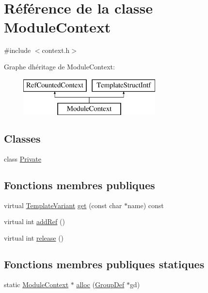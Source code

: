\hypertarget{class_module_context}{}\section{Référence de la classe Module\+Context}
\label{class_module_context}


{\ttfamily \#include $<$context.\+h$>$}

Graphe d\textquotesingle{}héritage de Module\+Context\+:\begin{figure}[H]
\begin{center}
\leavevmode
\includegraphics[height=2.000000cm]{class_module_context}
\end{center}
\end{figure}
\subsection*{Classes}
\begin{DoxyCompactItemize}
\item 
class \hyperlink{class_module_context_1_1_private}{Private}
\end{DoxyCompactItemize}
\subsection*{Fonctions membres publiques}
\begin{DoxyCompactItemize}
\item 
virtual \hyperlink{class_template_variant}{Template\+Variant} \hyperlink{class_module_context_aa0986b02c8c5bd6e29c1fedb9f9f576a}{get} (const char $\ast$name) const 
\item 
virtual int \hyperlink{class_module_context_a356f888bf1ecbd08dd2a6b4a7313178e}{add\+Ref} ()
\item 
virtual int \hyperlink{class_module_context_aae936bd6b861311eca3bf960e0612348}{release} ()
\end{DoxyCompactItemize}
\subsection*{Fonctions membres publiques statiques}
\begin{DoxyCompactItemize}
\item 
static \hyperlink{class_module_context}{Module\+Context} $\ast$ \hyperlink{class_module_context_aa67bad00d37d32fdba90d5a2d5e17354}{alloc} (\hyperlink{class_group_def}{Group\+Def} $\ast$gd)
\end{DoxyCompactItemize}


